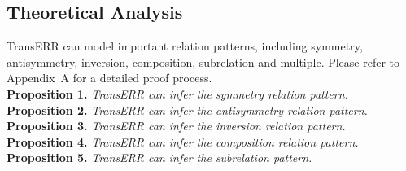 \documentclass[10pt, a4paper]{article}
\begin{document}
\subsection{Theoretical Analysis}\label{sec4.2}
TransERR can model important relation patterns, including symmetry, antisymmetry, inversion, composition, subrelation and multiple. Please refer to Appendix~A for a detailed proof process.\\
\textbf{Proposition 1.} \emph{TransERR can infer the symmetry relation pattern.}\\
\textbf{Proposition 2.} \emph{TransERR can infer the antisymmetry relation pattern.}\\
\textbf{Proposition 3.} \emph{TransERR can infer the inversion relation pattern.}\\
\textbf{Proposition 4.} \emph{TransERR can infer the composition relation pattern.}\\
\textbf{Proposition 5.} \emph{TransERR can infer the subrelation pattern.}\\


\begin{table}[!htb]
	\centering
	\caption{Statistics of the datasets in the experiment.}
	\label{tab:dataset}
\end{table}
\end{document}

